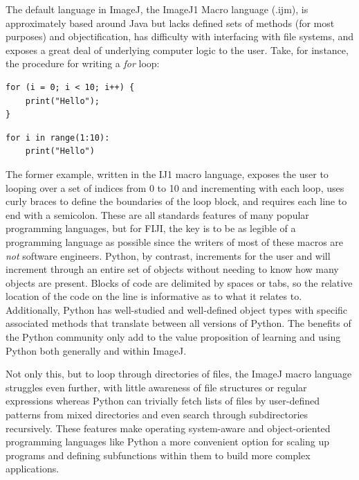 The default language in ImageJ, the ImageJ1 Macro language (.ijm), is approximately based around Java but lacks defined sets of methods (for most purposes) and objectification, has difficulty with interfacing with file systems, and exposes a great deal of underlying computer logic to the user. Take, for instance, the procedure for writing a \textit{for} loop:

\begin{code}
\begin{verbatim}
for (i = 0; i < 10; i++) {
    print("Hello");
}
\end{verbatim}
\end{code}

\begin{code}
\begin{verbatim}
for i in range(1:10):
    print("Hello")
\end{verbatim}
\end{code}

The former example, written in the IJ1 macro language, exposes the user to looping over a set of indices from 0 to 10 and incrementing with each loop, uses curly braces to define the boundaries of the loop block, and requires each line to end with a semicolon. These are all standards features of many popular programming languages, but for FIJI, the key is to be as legible of a programming language as possible since the writers of most of these macros are \textit{not} software engineers. Python, by contrast, increments for the user and will increment through an entire set of objects without needing to know how many objects are present. Blocks of code are delimited by spaces or tabs, so the relative location of the code on the line is informative as to what it relates to. Additionally, Python has well\hyp{}studied and well\hyp{}defined object types with specific associated methods that translate between all versions of Python. The benefits of the Python community only add to the value proposition of learning and using Python both generally and within ImageJ.

Not only this, but to loop through directories of files, the ImageJ macro language struggles even further, with little awareness of file structures or regular expressions whereas Python can trivially fetch lists of files by user\hyp{}defined patterns from mixed directories and even search through subdirectories recursively. These features make operating system\hyp{}aware and object\hyp{}oriented programming languages like Python a more convenient option for scaling up programs and defining subfunctions within them to build more complex applications.
 
